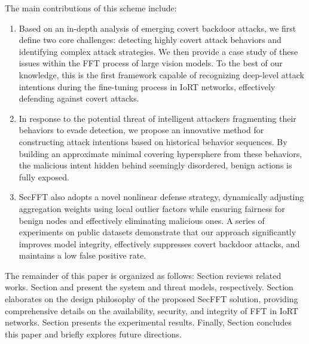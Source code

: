 \documentclass[lettersize,journal]{IEEEtran}
\begin{document}
The main contributions of this scheme include:
\begin{enumerate}
    \item Based on an in-depth analysis of emerging covert backdoor attacks, we first define two core challenges: detecting highly covert attack behaviors and identifying complex attack strategies. We then provide a case study of these issues within the FFT process of large vision models. To the best of our knowledge, this is the first framework capable of recognizing deep-level attack intentions during the fine-tuning process in IoRT networks, effectively defending against covert attacks.
    \item In response to the potential threat of intelligent attackers fragmenting their behaviors to evade detection, we propose an innovative method for constructing attack intentions based on historical behavior sequences. By building an approximate minimal covering hypersphere from these behaviors, the malicious intent hidden behind seemingly disordered, benign actions is fully exposed. 
    \item SecFFT also adopts a novel nonlinear defense strategy, dynamically adjusting aggregation weights using local outlier factors while ensuring fairness for benign nodes and effectively eliminating malicious ones. A series of experiments on public datasets demonstrate that our approach significantly improves model integrity, effectively suppresses covert backdoor attacks, and maintains a low false positive rate.
\end{enumerate}

The remainder of this paper is organized as follows: Section \uppercase\expandafter{} reviews related works. Section \uppercase\expandafter{} and \uppercase\expandafter{} present the system and threat models, respectively. Section \uppercase\expandafter{} elaborates on the design philosophy of the proposed SecFFT solution, providing comprehensive details on the availability, security, and integrity of FFT in IoRT networks. Section \uppercase\expandafter{} presents the experimental results. Finally, Section \uppercase\expandafter{} concludes this paper and briefly explores future directions.
\end{document}
